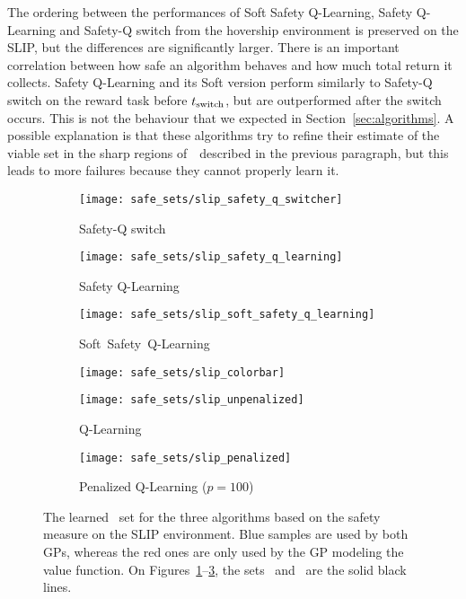 The ordering between the performances of Soft Safety Q-Learning, Safety Q-Learning and Safety-Q switch from the hovership environment is preserved on the SLIP, but the differences are significantly larger. There is an important correlation between how safe an algorithm behaves and how much total return it collects. Safety Q-Learning and its Soft version perform similarly to Safety-Q switch on the reward task before $t_\text{switch}$, but are outperformed after the switch occurs. This is not the behaviour that we expected in Section~\ref{sec:algorithms}. A possible explanation is that these algorithms try to refine their estimate of the viable set in the sharp regions of~\QV~described in the previous paragraph, but this leads to more failures because they cannot properly learn it.

\begin{figure}[t]
	\centering
	\captionsetup[subfigure]{width=1.1\textwidth}
	\begin{subfigure}{0.29\textwidth}
		\centering
		\texttt{[image: safe\_sets/slip\_safety\_q\_switcher]}
		\caption{Safety-Q switch}
		\label{fig:learned sets:slip:switch}
	\end{subfigure}	
	\begin{subfigure}{0.29\textwidth}
		\centering
		\texttt{[image: safe\_sets/slip\_safety\_q\_learning]}
		\caption{Safety Q-Learning}
		\label{fig:learned sets:slip:safety q learning}
	\end{subfigure}	
	\begin{subfigure}{0.29\textwidth}
		\centering
		\texttt{[image: safe\_sets/slip\_soft\_safety\_q\_learning]}
		\caption{\mbox{Soft Safety Q-Learning}}
		\label{fig:learned sets:slip:soft safety q learning}
	\end{subfigure}	
	\begin{subfigure}{0.1\textwidth}
		\texttt{[image: safe\_sets/slip\_colorbar]}
		\vspace{1cm}
	\end{subfigure}\newline
	\begin{subfigure}{0.39\textwidth}
		\texttt{[image: safe\_sets/slip\_unpenalized]}
		\caption{Q-Learning}
		\label{fig:learned sets:slip:q learning}
	\end{subfigure}
	\begin{subfigure}{0.39\textwidth}
		\texttt{[image: safe\_sets/slip\_penalized]}
		\caption{Penalized Q-Learning ($p=100$)}
		\label{fig:learned sets:slip:penalized}
	\end{subfigure}
	\caption{The learned \Qcaut~set for the three algorithms based on the safety measure on the SLIP environment. Blue samples are used by both GPs, whereas the red ones are only used by the GP modeling the value function. On Figures~\ref{fig:learned sets:slip:switch}--\ref{fig:learned sets:slip:soft safety q learning}, the sets \QV~and \Qcaut~are the solid black lines.}
	\label{fig:learned sets:slip}
\end{figure}
